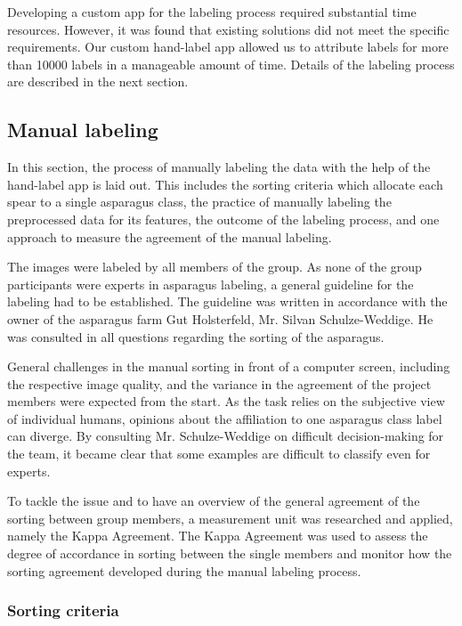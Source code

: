 \bigskip
Developing a custom app for the labeling process required substantial time resources. However, it was found that existing solutions did not meet the specific requirements. Our custom hand-label app allowed us to attribute labels for more than 10000 labels in a manageable amount of time. Details of the labeling process are described in the next section.

\newpage

\subsection{Manual labeling}
\label{sec:ManualLabeling}

In this section, the process of manually labeling the data with the help of the hand-label app is laid out. This includes the sorting criteria which allocate each spear to a single asparagus class, the practice of manually labeling the preprocessed data for its features, the outcome of the labeling process, and one approach to measure the agreement of the manual labeling.

\bigskip
The images were labeled by all members of the group. As none of the group participants were experts in asparagus labeling, a general guideline for the labeling had to be established. The guideline was written in accordance with the owner of the asparagus farm Gut Holsterfeld, Mr. Silvan Schulze-Weddige. He was consulted in all questions regarding the sorting of the asparagus. 

General challenges in the manual sorting in front of a computer screen, including the respective image quality, and the variance in the agreement of the project members were expected from the start. As the task relies on the subjective view of individual humans, opinions about the affiliation to one asparagus class label can diverge. By consulting Mr. Schulze-Weddige on difficult decision-making for the team, it became clear that some examples are difficult to classify even for experts. 

To tackle the issue and to have an overview of the general agreement of the sorting between group members, a measurement unit was researched and applied, namely the Kappa Agreement. The Kappa Agreement was used to assess the degree of accordance in sorting between the single members and monitor how the sorting agreement developed during the manual labeling process. 


\subsubsection{Sorting criteria}
\label{subsec:SortingCriteria}

